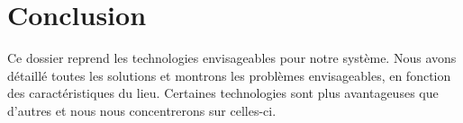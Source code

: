 
\section{Conclusion}

Ce dossier reprend les technologies envisageables pour notre système. Nous avons détaillé toutes les solutions et montrons les problèmes envisageables, en fonction des caractéristiques du lieu. Certaines technologies sont plus avantageuses que d'autres et nous nous concentrerons sur celles-ci.

